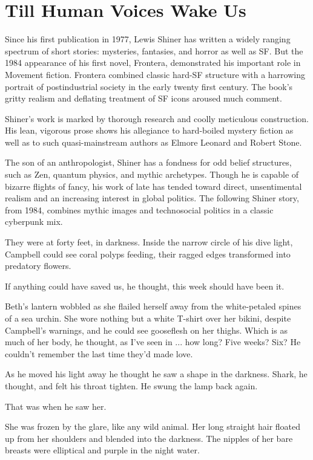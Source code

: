 \chapter*{Till Human Voices Wake Us}

Since his first publication in 1977, Lewis Shiner has written a widely ranging spectrum of short stories: mysteries, fantasies, and horror as well as SF. But the 1984 appearance of his first novel, Frontera, demonstrated his important role in Movement fiction. Frontera combined classic hard-SF structure with a harrowing portrait of postindustrial society in the early twenty first century. The book's gritty realism and deflating treatment of SF icons aroused much comment.

Shiner's work is marked by thorough research and coolly meticulous construction. His lean, vigorous prose shows his allegiance to hard-boiled mystery fiction as well as to such quasi-mainstream authors as Elmore Leonard and Robert Stone.

The son of an anthropologist, Shiner has a fondness for odd belief structures, such as Zen, quantum physics, and mythic archetypes. Though he is capable of bizarre flights of fancy, his work of late has tended toward direct, unsentimental realism and an increasing interest in global politics. The following Shiner story, from 1984, combines mythic images and technosocial politics in a classic cyberpunk mix.

\hrulefill

They were at forty feet, in darkness. Inside the narrow circle of his dive light, Campbell could see coral polyps feeding, their ragged edges transformed into predatory flowers.

If anything could have saved us, he thought, this week should have been it.

Beth's lantern wobbled as she flailed herself away from the white-petaled spines of a sea urchin. She wore nothing but a white T-shirt over her bikini, despite Campbell's warnings, and he could see gooseflesh on her thighs. Which is as much of her body, he thought, as I've seen in ... how long? Five weeks? Six? He couldn't remember the last time they'd made love.

As he moved his light away he thought he saw a shape in the darkness. Shark, he thought, and felt his throat tighten. He swung the lamp back again.

That was when he saw her.

She was frozen by the glare, like any wild animal. Her long straight hair floated up from her shoulders and blended into the darkness. The nipples of her bare breasts were elliptical and purple in the night water.

